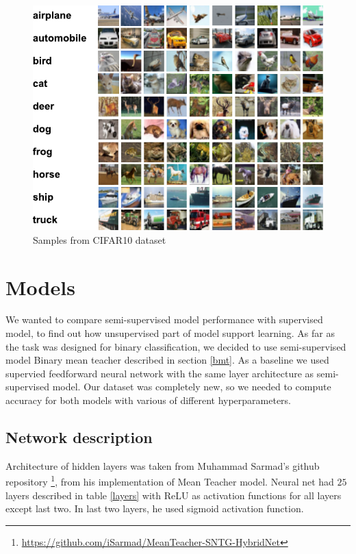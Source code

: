 \begin{figure}
    \centering
    \includegraphics{figs/cifar10-sample-fig.pdf}
    \caption{Samples from CIFAR10 dataset}
    \label{fig:cifar10}
\end{figure}


\section{Models}

We wanted to compare semi-supervised model performance with supervised model, to find out how unsupervised part of model support learning. As far as the task was designed for binary classification, we decided to use semi-supervised model Binary mean teacher described in section \ref{bmt}. As a baseline we used supervied feedforward neural network with the same layer architecture as semi-supervised model. Our dataset was completely new, so we needed to compute accuracy for both models with various of different hyperparameters. 
 
\subsection{Network description}
Architecture of hidden layers was taken from Muhammad Sarmad's github repository \footnote{\url{https://github.com/iSarmad/MeanTeacher-SNTG-HybridNet}}, from his implementation of Mean Teacher model. Neural net had $25$ layers described in table \ref{layers} with ReLU as activation functions for all layers except last two. In last two layers, he used sigmoid activation function.


